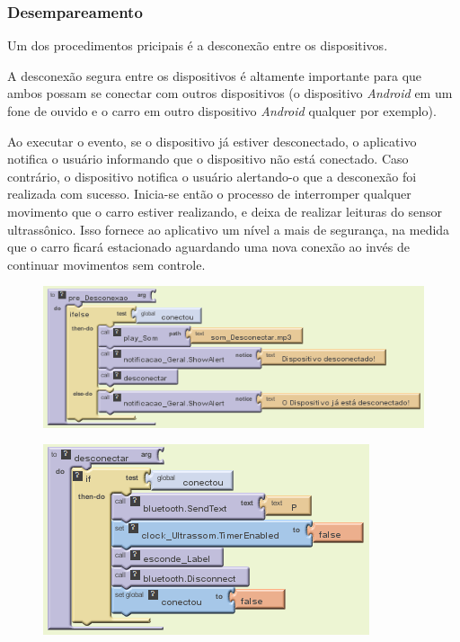 \documentclass[portugues, brazil, a4paper,12pt]{article}
\begin{document}
\subsubsection{Desempareamento}
Um dos procedimentos pricipais é a desconexão entre os dispositivos.

A desconexão segura entre os dispositivos é altamente importante para que ambos possam se conectar com outros dispositivos (o dispositivo \textit{Android} em um fone de ouvido e o carro em outro dispositivo \textit{Android} qualquer por exemplo).

Ao executar o evento, se o dispositivo já estiver desconectado, o aplicativo notifica o usuário informando que o dispositivo não está conectado. Caso contrário, o dispositivo notifica o usuário alertando-o que a desconexão foi realizada com sucesso. Inicia-se então o processo de interromper qualquer movimento que o carro estiver realizando, e deixa de realizar leituras do sensor ultrassônico. Isso fornece ao aplicativo um nível a mais de segurança, na medida que o carro ficará estacionado aguardando uma nova conexão ao invés de continuar movimentos sem controle.

\begin{figure}[H]
	\centering
	\includegraphics[scale=.8]{img/controle/desconexao.png}
	
\end{figure}

\begin{figure}[H]
	\centering
	\includegraphics[scale=.8]{img/controle/desconectar.png}
	
\end{figure}
\end{document}
